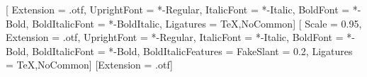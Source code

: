%
\setmainfont{LibertinusSerif}[
  Extension		= .otf,
  UprightFont		= *-Regular,
  ItalicFont		= *-Italic,
  BoldFont		= *-Bold,
  BoldItalicFont	= *-BoldItalic,
  Ligatures		= {TeX,NoCommon}]
\setsansfont{LibertinusSans}[
  Scale			= 0.95,
  Extension		= .otf,
  UprightFont		= *-Regular,
  ItalicFont		= *-Italic,
  BoldFont		= *-Bold,
  BoldItalicFont	= *-Bold,
  BoldItalicFeatures	= {FakeSlant = 0.2},
  Ligatures		= {TeX,NoCommon}]
\setmonofont{LibertinusMono-Regular}[Extension = .otf]

%
\newcommand{\CJKface}[2]{%
  \newCJKfontfamily#1{NotoSansCJK-Regular.ttc}[%
    FontIndex = #2, ItalicFont = NotoSansCJK-Regular.ttc,
    ItalicFeatures = {FontIndex = #2}]}

